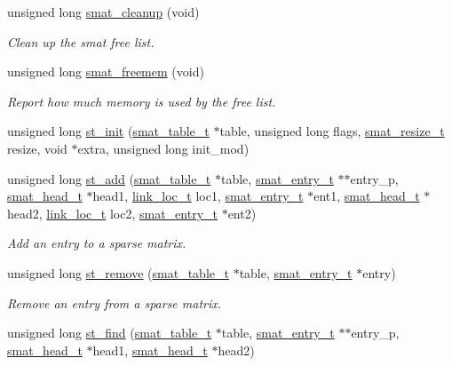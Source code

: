 \begin{CompactItemize}
\item 
unsigned long \hyperlink{group__dbprim__smat_a7}{smat\_\-cleanup} (void)
\begin{CompactList}\small\item\em Clean up the smat free list.\item\end{CompactList}\item 
unsigned long \hyperlink{group__dbprim__smat_a8}{smat\_\-freemem} (void)
\begin{CompactList}\small\item\em Report how much memory is used by the free list.\item\end{CompactList}\item 
unsigned long \hyperlink{group__dbprim__smat_a9}{st\_\-init} (\hyperlink{group__dbprim__smat_a0}{smat\_\-table\_\-t} $\ast$table, unsigned long flags, \hyperlink{group__dbprim__smat_a3}{smat\_\-resize\_\-t} resize, void $\ast$extra, unsigned long init\_\-mod)
\item 
unsigned long \hyperlink{group__dbprim__smat_a10}{st\_\-add} (\hyperlink{group__dbprim__smat_a0}{smat\_\-table\_\-t} $\ast$table, \hyperlink{group__dbprim__smat_a2}{smat\_\-entry\_\-t} $\ast$$\ast$entry\_\-p, \hyperlink{group__dbprim__smat_a1}{smat\_\-head\_\-t} $\ast$head1, \hyperlink{group__dbprim__link_a4}{link\_\-loc\_\-t} loc1, \hyperlink{group__dbprim__smat_a2}{smat\_\-entry\_\-t} $\ast$ent1, \hyperlink{group__dbprim__smat_a1}{smat\_\-head\_\-t} $\ast$head2, \hyperlink{group__dbprim__link_a4}{link\_\-loc\_\-t} loc2, \hyperlink{group__dbprim__smat_a2}{smat\_\-entry\_\-t} $\ast$ent2)
\begin{CompactList}\small\item\em Add an entry to a sparse matrix.\item\end{CompactList}\item 
unsigned long \hyperlink{group__dbprim__smat_a11}{st\_\-remove} (\hyperlink{group__dbprim__smat_a0}{smat\_\-table\_\-t} $\ast$table, \hyperlink{group__dbprim__smat_a2}{smat\_\-entry\_\-t} $\ast$entry)
\begin{CompactList}\small\item\em Remove an entry from a sparse matrix.\item\end{CompactList}\item 
unsigned long \hyperlink{group__dbprim__smat_a12}{st\_\-find} (\hyperlink{group__dbprim__smat_a0}{smat\_\-table\_\-t} $\ast$table, \hyperlink{group__dbprim__smat_a2}{smat\_\-entry\_\-t} $\ast$$\ast$entry\_\-p, \hyperlink{group__dbprim__smat_a1}{smat\_\-head\_\-t} $\ast$head1, \hyperlink{group__dbprim__smat_a1}{smat\_\-head\_\-t} $\ast$head2)

\end{CompactItemize}
